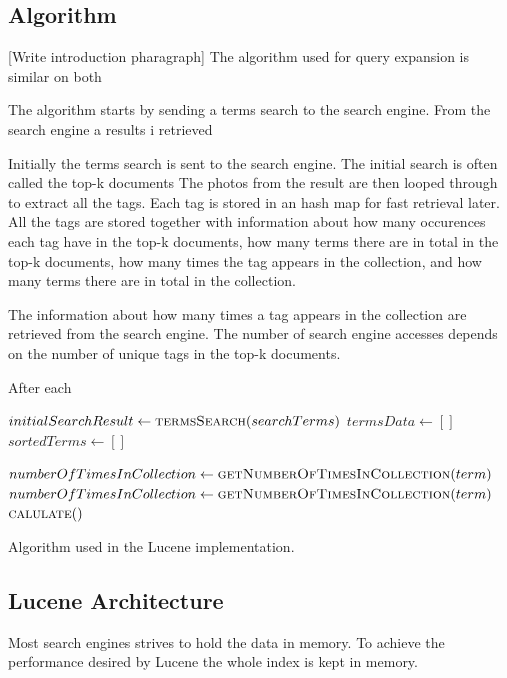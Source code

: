 \subsection{Algorithm}
[Write introduction pharagraph]
The algorithm used for query expansion is similar on both

The algorithm starts by sending a terms search to the search engine.
From the search engine a results i retrieved

Initially the terms search is sent to the search engine.
The initial search is often called the top-k documents
The photos from the result are then looped through to extract all the tags.
Each tag is stored in an hash map for fast retrieval later.
All the tags are stored together with information about how many occurences each tag have in the top-k documents,
how many terms there are in total in the top-k documents,
how many times the tag appears in the collection,
and how many terms there are in total in the collection.

The information about how many times a tag appears in the collection are retrieved from the search engine.
The number of search engine accesses depends on the number of unique tags in the top-k documents.

After each


\begin{algorithm}
  \begin{algorithmic}
    \State $initialSearchResult \gets \Call{termsSearch}{searchTerms}$
    \State $termsData \gets [ ]$
    \State $sortedTerms \gets [ ]$

        \State $numberOfTimesInCollection \gets \Call{getNumberOfTimesInCollection}{term}$
        \State $numberOfTimesInCollection \gets \Call{getNumberOfTimesInCollection}{term}$
        \State {}
      \EndFor
    \EndFor
      \State $\Call{calulate}$
    \EndFor

  \end{algorithmic}
  \caption{Algorithm used in the Lucene implementation.}
\end{algorithm}

\subsection{Lucene Architecture}
Most search engines strives to hold the data in memory.
To achieve the performance desired by Lucene the whole index is kept in memory.

